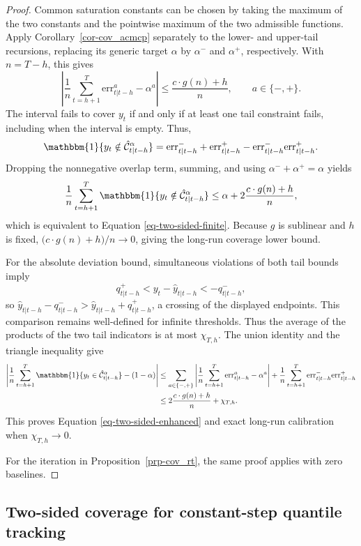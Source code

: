 \documentclass[
  american,
  12pt]{article}
\theoremstyle{plain}
\theoremstyle{plain}
\theoremstyle{remark}
\begin{document}
\begin{proof}
Common saturation constants can be chosen by taking the maximum of the
two constants and the pointwise maximum of the two admissible functions.
Apply Corollary~\ref{cor-cov_acmcp} separately to the lower- and
upper-tail recursions, replacing its generic target \(\alpha\) by
\(\alpha^{-}\) and \(\alpha^{+}\), respectively. With \(n=T-h\), this
gives \[
\left|\frac{1}{n}\sum_{t=h+1}^{T}\mathrm{err}_{t|t-h}^{a}-\alpha^{a}\right|\leq \frac{c\cdot g(n)+h}{n},
\qquad a\in\{-,+\}.
\] The interval fails to cover \(y_t\) if and only if at least one tail
constraint fails, including when the interval is empty. Thus, \[
\mathbbm{1}\{y_t\notin\hat{\mathcal C}_{t|t-h}^{\alpha}\}
=\mathrm{err}_{t|t-h}^{-}+\mathrm{err}_{t|t-h}^{+}-\mathrm{err}_{t|t-h}^{-}\mathrm{err}_{t|t-h}^{+}.
\] Dropping the nonnegative overlap term, summing, and using
\(\alpha^{-}+\alpha^{+}=\alpha\) yields \[
\frac{1}{n}\sum_{t=h+1}^{T}\mathbbm{1}\{y_t\notin\hat{\mathcal C}_{t|t-h}^{\alpha}\}
\leq \alpha+2\frac{c\cdot g(n)+h}{n},
\] which is equivalent to Equation \eqref{eq-two-sided-finite}. Because
\(g\) is sublinear and \(h\) is fixed,
\(\bigl(c\cdot g(n)+h\bigr)/n\to0\), giving the long-run coverage lower
bound.

For the absolute deviation bound, simultaneous violations of both tail
bounds imply \[
q_{t|t-h}^{+}<y_t-\hat y_{t|t-h}< -q_{t|t-h}^{-},
\] so \(\hat y_{t|t-h}-q_{t|t-h}^{-}>\hat y_{t|t-h}+q_{t|t-h}^{+}\), a
crossing of the displayed endpoints. This comparison remains
well-defined for infinite thresholds. Thus the average of the products
of the two tail indicators is at most \(\chi_{T,h}\). The union identity
and the triangle inequality give \[
\begin{aligned}
\left|\frac1n\sum_{t=h+1}^{T}\mathbbm{1}\{y_t\in\hat{\mathcal C}_{t|t-h}^{\alpha}\}-(1-\alpha)\right|
&\leq\sum_{a\in\{-,+\}}\left|\frac1n\sum_{t=h+1}^{T}\mathrm{err}_{t|t-h}^{a}-\alpha^a\right|
+\frac1n\sum_{t=h+1}^{T}\mathrm{err}_{t|t-h}^{-}\mathrm{err}_{t|t-h}^{+}\\
&\leq2\frac{c\cdot g(n)+h}{n}+\chi_{T,h}.
\end{aligned}
\] This proves Equation \eqref{eq-two-sided-enhanced} and exact long-run
calibration when \(\chi_{T,h}\to0\).

For the iteration in Proposition~\ref{prp-cov_rt}, the same proof
applies with zero baselines.
\end{proof}

\subsection{Two-sided coverage for constant-step quantile
tracking}\label{sec-two-sided-constant-step}
\end{document}
